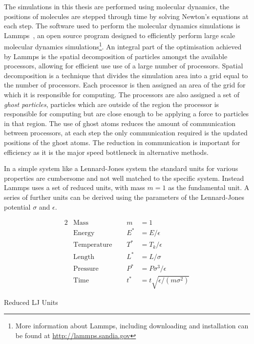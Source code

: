 The simulations in this thesis are performed using molecular dynamics, the positions of molecules are stepped through time by solving Newton's equations at each step. The software used to perform the molecular dynamics simulations is Lammps~\cite{plimpton:95b}, an open source program designed to efficiently perform large scale molecular dynamics simulations\footnote{More information about Lammps, including downloading and installation can be found at \href{http://lammps.sandia.gov}{http://lammps.sandia.gov}}. An integral part of the optimisation achieved by Lammps is the spatial decomposition of particles amongst the available processors, allowing for efficient use use of a large number of processors. Spatial decomposition is a technique that divides the simulation area into a grid equal to the number of processors. Each processor is then assigned an area of the grid for which it is responsible for computing. The processors are also assigned a set of \emph{ghost particles}, particles which are outside of the region the processor is responsible for computing but are close enough to be applying a force to particles in that region. The use of ghost atoms reduces the amount of communication between processors, at each step the only communication required is the updated positions of the ghost atoms. The reduction in communication is important for efficiency as it is the major speed bottleneck in alternative methods.

In a simple system like a Lennard-Jones system the standard units for various properties are cumbersome and not well matched to the specific system. Instead Lammps uses a set of reduced units, with mass $m = 1$ as the fundamental unit. A series of further units can be derived using the parameters of the Lennard-Jones potential $\sigma$ and $\epsilon$. 

\begin{table}
    \centering
    \begin{alignat*}{2}
        &\text{Mass} & m &= 1 \\
        &\text{Energy} & E^* &= E/\epsilon \\
        &\text{Temperature  }\quad& T^* &= T_k/\epsilon \\
        &\text{Length} & L^* &= L/\sigma \\
        &\text{Pressure} & P^* &= P\sigma^3/\epsilon \\
        &\text{Time} & t^* &= t\sqrt{\epsilon/(m\sigma^2)}
    \end{alignat*}
    \caption{Reduced LJ Units}
    \label{tab:reduced units}
\end{table}


